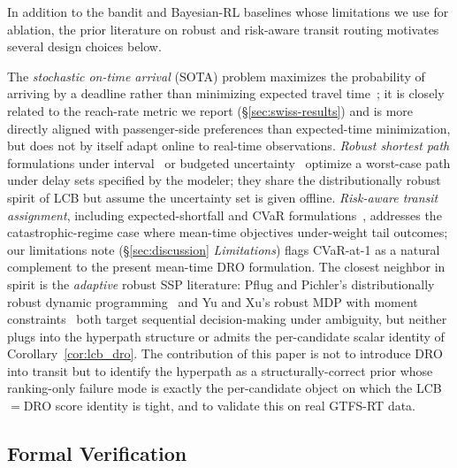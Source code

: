 \documentclass[11pt]{article}
\theoremstyle{definition}
\theoremstyle{remark}
\begin{document}
In addition to the bandit and Bayesian-RL baselines whose
limitations we use for ablation, the prior literature on robust
and risk-aware transit routing motivates several design choices
below.

The \emph{stochastic on-time arrival} (SOTA) problem maximizes the
probability of arriving by a deadline rather than minimizing
expected travel time~\cite{nikolova2006,fan2005}; it is closely
related to the reach-rate metric we report (\S\ref{sec:swiss-results})
and is more directly aligned with passenger-side preferences than
expected-time minimization, but does not by itself adapt online to
real-time observations. \emph{Robust shortest path} formulations
under interval~\cite{karasan2001,bertsimas2003} or budgeted
uncertainty~\cite{bertsimas2004} optimize a worst-case path under
delay sets specified by the modeler; they share the
distributionally robust spirit of LCB but assume the uncertainty set
is given offline. \emph{Risk-aware transit assignment}, including
expected-shortfall and CVaR formulations~\cite{chow2015,fan2005},
addresses the catastrophic-regime case where mean-time objectives
under-weight tail outcomes; our limitations note
(\S\ref{sec:discussion} \emph{Limitations}) flags CVaR-at-1 as a
natural complement to the present mean-time DRO formulation.
The closest neighbor in spirit is the \emph{adaptive} robust SSP
literature: Pflug and Pichler's distributionally robust dynamic
programming~\cite{pflug2014} and Yu and Xu's robust MDP with
moment constraints~\cite{yu2016} both target sequential
decision-making under ambiguity, but neither plugs into the
hyperpath structure or admits the per-candidate scalar identity
of Corollary~\ref{cor:lcb_dro}. The contribution of this paper is
not to introduce DRO into transit but to identify the hyperpath as
a structurally-correct prior whose ranking-only failure mode is
exactly the per-candidate object on which the LCB$=$DRO score
identity is tight, and to validate this on real GTFS-RT data.

\subsection{Formal Verification}
\end{document}
